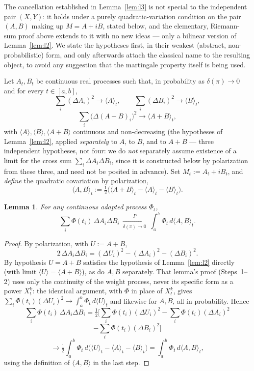 \documentclass[11pt,fleqn]{article}
\theoremstyle{plain}
\newtheorem{lemma}[thm]{Lemma}
\theoremstyle{remark}
\begin{document}
The cancellation established in Lemma~\ref{lem:l3} is not special to the
independent pair $(X,Y)$: it holds under a purely quadratic-variation
condition on the pair $(A,B)$ making up $M=A+iB$, stated below, and the
elementary, Riemann-sum proof above extends to it with no new ideas —
only a bilinear version of Lemma~\ref{lem:l2}. We state the hypotheses
first, in their weakest (abstract, non-probabilistic) form, and only
afterwards attach the classical name to the resulting object, to avoid
any suggestion that the martingale property itself is being used.

Let $A_t,B_t$ be continuous real processes such that, in probability as
$\delta(\pi)\to0$ and for every $t\in[a,b]$,
\[
\sum_i(\Delta A_i)^2\to\langle A\rangle_t,\qquad
\sum_i(\Delta B_i)^2\to\langle B\rangle_t,
\]
\[
\sum_i\big(\Delta(A+B)_i\big)^2\to\langle A+B\rangle_t,
\]
with $\langle A\rangle,\langle B\rangle,\langle A+B\rangle$ continuous and
non-decreasing (the hypotheses of Lemma~\ref{lem:l2}, applied
\emph{separately} to $A$, to $B$, and to $A+B$ --- three independent
hypotheses, not four: we do \emph{not} separately assume existence of a
limit for the cross sum $\sum_i\Delta A_i\Delta B_i$, since it is
constructed below by polarization from these three, and need not be
posited in advance). Set $M_t:=A_t+iB_t$, and \emph{define} the
quadratic covariation by polarization,
\[
\langle A,B\rangle_t:=\tfrac12\big(\langle A+B\rangle_t-\langle
A\rangle_t-\langle B\rangle_t\big).
\]

\begin{lemma}\label{lem:bilinear}
For any continuous adapted process $\Phi_t$,
\[
\sum_i\Phi(t_i)\,\Delta A_i\Delta B_i\ \xrightarrow[\delta(\pi)\to0]{P}\
\int_a^b\Phi_t\,d\langle A,B\rangle_t.
\]
\end{lemma}
\begin{proof}
By polarization, with $U:=A+B$,
\[
2\,\Delta A_i\Delta B_i=(\Delta U_i)^2-(\Delta A_i)^2-(\Delta B_i)^2.
\]
By hypothesis $U=A+B$ satisfies the hypothesis of Lemma~\ref{lem:l2}
directly (with limit $\langle U\rangle=\langle A+B\rangle$), as do $A,B$
separately. That lemma's proof (Steps~1--2) uses only the continuity of
the weight process, never its specific form as a power $X_t^k$: the
identical argument, with $\Phi$ in place of $X_t^k$, gives
$\sum_i\Phi(t_i)(\Delta U_i)^2\to\int_a^b\Phi_t\,d\langle U\rangle_t$ and
likewise for $A,B$, all in probability. Hence
\[
\sum_i\Phi(t_i)\,\Delta A_i\Delta B_i
=\tfrac12\Big[\sum_i\Phi(t_i)(\Delta U_i)^2-\sum_i\Phi(t_i)(\Delta A_i)^2
\]
\[
-\sum_i\Phi(t_i)(\Delta B_i)^2\Big]
\]
\[
\longrightarrow\tfrac12\int_a^b\Phi_t\,d\big(\langle U\rangle_t-\langle
A\rangle_t-\langle B\rangle_t\big)=\int_a^b\Phi_t\,d\langle A,B\rangle_t,
\]
using the definition of $\langle A,B\rangle$ in the last step.
\end{proof}
\end{document}
